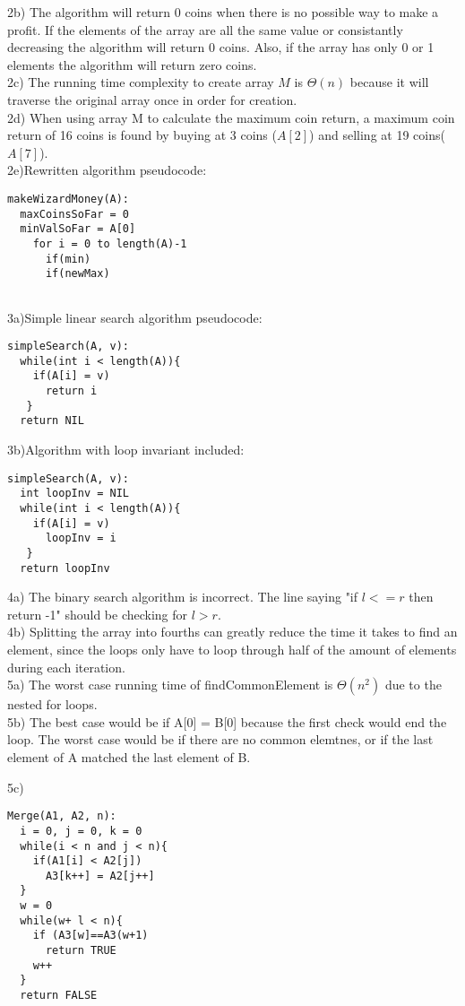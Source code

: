 \documentclass{article}
\begin{document}
2b) The algorithm will return 0 coins when there is no possible way to make a profit. If the elements of the array are all the same value or consistantly decreasing the algorithm will return 0 coins. Also, if the array has only 0 or 1 elements the algorithm will return zero coins.\\

2c) The running time complexity to create array $M$ is $\Theta(n)$ because it will traverse the original array once in order for creation.\\

2d) When using array M to calculate the maximum coin return, a maximum coin return of 16 coins is found by buying at 3 coins ($A[2]$) and selling at 19 coins($A[7]$).\\

2e)Rewritten algorithm pseudocode:
\begin{lstlisting}
makeWizardMoney(A):
  maxCoinsSoFar = 0
  minValSoFar = A[0]
    for i = 0 to length(A)-1
      if(min)
      if(newMax)
      
\end{lstlisting}

3a)Simple linear search algorithm pseudocode:
\begin{lstlisting}
simpleSearch(A, v):
  while(int i < length(A)){
    if(A[i] = v)
      return i
   }
  return NIL
\end{lstlisting}

3b)Algorithm with loop invariant included:
\begin{lstlisting}
simpleSearch(A, v):
  int loopInv = NIL
  while(int i < length(A)){
    if(A[i] = v)
      loopInv = i
   }
  return loopInv
\end{lstlisting}

4a) The binary search algorithm is incorrect. The line saying "if $l <= r$ then return -1" should be checking for $l > r$.\\

4b) Splitting the array into fourths can greatly reduce the time it takes to find an element, since the loops only have to loop through half of the amount of elements during each iteration.\\

5a) The worst case running time of findCommonElement is $\Theta(n^2)$ due to the nested for loops.\\

5b) The best case would be if A[0] = B[0] because the first check would end the loop. The worst case would be if there are no common elemtnes, or if the last element of A matched the last element of B.

5c)\begin{lstlisting}
Merge(A1, A2, n):
  i = 0, j = 0, k = 0
  while(i < n and j < n){
    if(A1[i] < A2[j])
      A3[k++] = A2[j++]
  }
  w = 0
  while(w+ l < n){
    if (A3[w]==A3(w+1)
      return TRUE
    w++
  }
  return FALSE

\end{lstlisting} 
\end{document}
